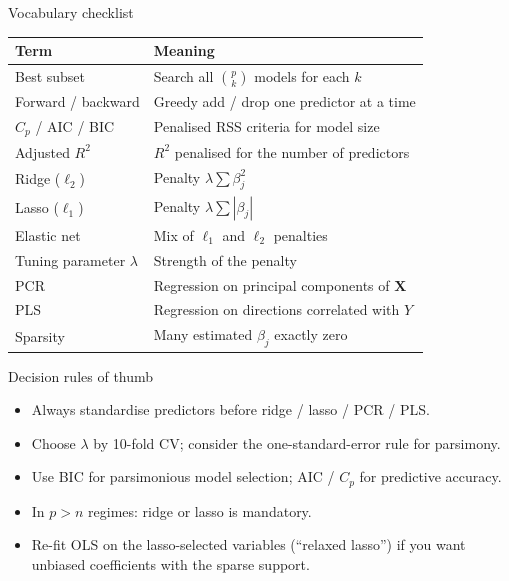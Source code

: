 \documentclass[aspectratio=169,11pt]{beamer}
\begin{document}
\begin{frame}{Vocabulary checklist}
  \footnotesize
  \begin{tabular}{ll}
    \toprule
    \textbf{Term} & \textbf{Meaning} \\
    \midrule
    Best subset & Search all $\binom{p}{k}$ models for each $k$ \\
    Forward / backward & Greedy add / drop one predictor at a time \\
    $C_p$ / AIC / BIC & Penalised RSS criteria for model size \\
    Adjusted $R^2$ & $R^2$ penalised for the number of predictors \\
    Ridge ($\ell_2$) & Penalty $\lambda \sum \beta_j^2$ \\
    Lasso ($\ell_1$) & Penalty $\lambda \sum |\beta_j|$ \\
    Elastic net & Mix of $\ell_1$ and $\ell_2$ penalties \\
    Tuning parameter $\lambda$ & Strength of the penalty \\
    PCR & Regression on principal components of $\mathbf{X}$ \\
    PLS & Regression on directions correlated with $Y$ \\
    Sparsity & Many estimated $\beta_j$ exactly zero \\
    \bottomrule
  \end{tabular}
\end{frame}

\begin{frame}{Decision rules of thumb}
  \begin{itemize}
    \item Always standardise predictors before ridge / lasso / PCR /
          PLS.
    \item Choose $\lambda$ by 10-fold CV; consider the
          one-standard-error rule for parsimony.
    \item Use BIC for parsimonious model selection; AIC / $C_p$ for
          predictive accuracy.
    \item In $p > n$ regimes: ridge or lasso is mandatory.
    \item Re-fit OLS on the lasso-selected variables (``relaxed lasso'')
          if you want unbiased coefficients with the sparse support.
  \end{itemize}
\end{frame}
\end{document}
